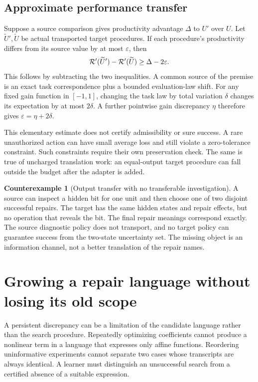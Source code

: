 \documentclass[11pt,letterpaper]{article}
\theoremstyle{plain}
\theoremstyle{definition}
\newtheorem{counterexample}[theorem]{Counterexample}
\begin{document}
\subsection{Approximate performance transfer}
Suppose a source comparison gives productivity advantage $\Delta$ to $U'$ over $U$. Let $\widetilde U',\widetilde U$ be actual transported target procedures. If each procedure's productivity differs from its source value by at most $\varepsilon$, then
\begin{equation}\label{eq:gaintransport}
\mathcal R'(\widetilde U')-\mathcal R'(\widetilde U)
\geq\Delta-2\varepsilon.
\end{equation}
This follows by subtracting the two inequalities. A common source of the premise is an exact task correspondence plus a bounded evaluation-law shift. For any fixed gain function in $[-1,1]$, changing the task law by total variation $\delta$ changes its expectation by at most $2\delta$. A further pointwise gain discrepancy $\eta$ therefore gives $\varepsilon=\eta+2\delta$.

This elementary estimate does not certify admissibility or sure success. A rare unauthorized action can have small average loss and still violate a zero-tolerance constraint. Such constraints require their own preservation check. The same is true of uncharged translation work: an equal-output target procedure can fall outside the budget after the adapter is added.

\begin{counterexample}[Output transfer with no transferable investigation]\label{ex:unavailable}
A source can inspect a hidden bit for one unit and then choose one of two disjoint successful repairs. The target has the same hidden states and repair effects, but no operation that reveals the bit. The final repair meanings correspond exactly. The source diagnostic policy does not transport, and no target policy can guarantee success from the two-state uncertainty set. The missing object is an information channel, not a better translation of the repair names.
\end{counterexample}

\section{Growing a repair language without losing its old scope}\label{sec:grammar}
A persistent discrepancy can be a limitation of the candidate language rather than the search procedure. Repeatedly optimizing coefficients cannot produce a nonlinear term in a language that expresses only affine functions. Reordering uninformative experiments cannot separate two cases whose transcripts are always identical. A learner must distinguish an unsuccessful search from a certified absence of a suitable expression.
\end{document}
